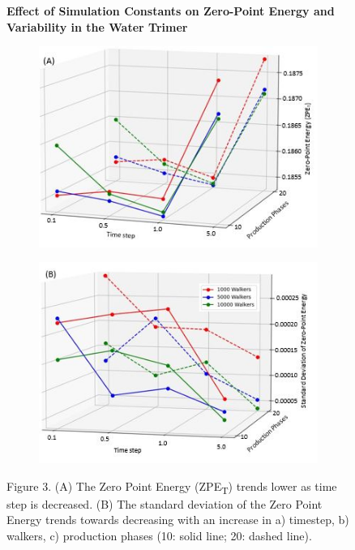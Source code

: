 \documentclass[journal=jacsat,manuscript=article]{achemso}
\newcommand*{\figuretitle}[1]{%
    {\centering%
    \textbf{#1}%
    \par\medskip}%
}
\begin{document}
\begin{figure}[H]
\centering
\figuretitle{Effect of Simulation Constants on Zero-Point Energy and Variability in the Water Trimer}
\begin{subfigure}{.5\textwidth}
 \centering
\includegraphics[width=\linewidth]{figures/fig_3A.jpg}
\end{subfigure}%
\begin{subfigure}{.5\textwidth}
 \centering
 \includegraphics[width=\linewidth]{figures/fig_3B.jpg}
\end{subfigure}
\caption{Figure 3. (A) The Zero Point Energy (ZPE\textsubscript{T}) trends lower as time step is decreased. (B) The standard deviation of the Zero Point Energy trends towards decreasing with an increase in a) timestep, b) walkers, c) production phases (10: solid line; 20: dashed line).}
\end{figure}
\end{document}

